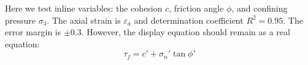 ﻿\documentclass{article}
\begin{document}
Here we test inline variables: the cohesion $c$, friction angle $\phi$, and confining pressure $\sigma_3$.
The axial strain is $\varepsilon_a$ and determination coefficient $R^2 = 0.95$.
The error margin is $\pm 0.3$.
However, the display equation should remain as a real equation:
\begin{equation}
\tau_f = c' + \sigma_n' \tan \phi'
\end{equation}
\end{document}
